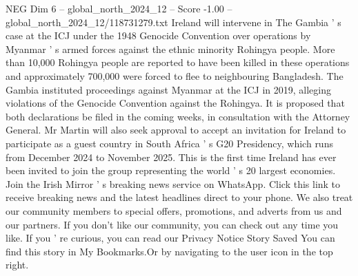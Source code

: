 \begin{textsample}{NEG Dim 6 – global\_north\_2024\_12 – Score -1.00 – global\_north\_2024\_12/118731279.txt}
Ireland will intervene in The Gambia ' s case at the ICJ under the 1948 Genocide Convention over operations by Myanmar ' s armed forces against the ethnic minority Rohingya people.
More than 10,000 Rohingya people are reported to have been killed in these operations and approximately 700,000 were forced to flee to neighbouring Bangladesh.
The Gambia instituted proceedings against Myanmar at the ICJ in 2019, alleging violations of the Genocide Convention against the Rohingya.
It is proposed that both declarations be filed in the coming weeks, in consultation with the Attorney General.
Mr Martin will also seek approval to accept an invitation for Ireland to participate as a guest country in South Africa ' s G20 Presidency, which runs from December 2024 to November 2025.
This is the first time Ireland has ever been invited to join the group representing the world ' s 20 largest economies.
Join the Irish Mirror ' s breaking news service on WhatsApp.
Click this link to receive breaking news and the latest headlines direct to your phone.
We also treat our community members to special offers, promotions, and adverts from us and our partners.
If you don't like our community, you can check out any time you like.
If you ' re curious, you can read our Privacy Notice Story Saved You can find this story in My Bookmarks.Or by navigating to the user icon in the top right.

\end{textsample}
